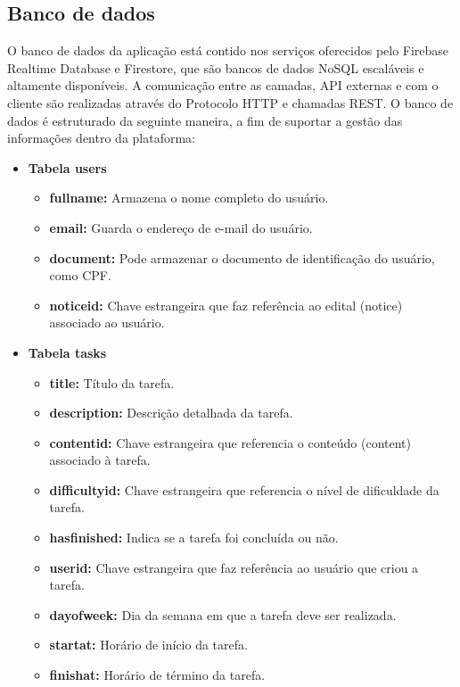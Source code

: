 \subsection{Banco de dados}
O banco de dados da aplicação está contido nos serviços oferecidos pelo Firebase Realtime Database e Firestore, que são bancos de dados NoSQL escaláveis e altamente disponíveis. A comunicação entre as camadas, API externas e com o cliente são realizadas através do Protocolo HTTP e chamadas REST.
O banco de dados é estruturado da seguinte maneira, a fim de suportar a gestão das informações dentro da plataforma:

\begin{itemize}
    \item \textbf{Tabela users}
    
    \begin{itemize}
    \item \textbf{fullname:} Armazena o nome completo do usuário.
    \item \textbf{email:} Guarda o endereço de e-mail do usuário.
    \item \textbf{document:} Pode armazenar o documento de identificação do usuário, como CPF. 
    \item \textbf{noticeid:} Chave estrangeira que faz referência ao edital (notice) associado ao usuário.
    \end{itemize}
    
    \item \textbf{Tabela tasks}
    
    \begin{itemize}
    \item \textbf{title:} Título da tarefa.
    \item \textbf{description:} Descrição detalhada da tarefa.
    \item \textbf{contentid:} Chave estrangeira que referencia o conteúdo (content) associado à tarefa. 
    \item \textbf{difficultyid:} Chave estrangeira que referencia o nível de dificuldade da tarefa. 
    \item \textbf{hasfinished:} Indica se a tarefa foi concluída ou não.
    \item \textbf{userid:} Chave estrangeira que faz referência ao usuário que criou a tarefa. 
    \item \textbf{dayofweek:} Dia da semana em que a tarefa deve ser realizada.
    \item \textbf{startat:} Horário de início da tarefa.
    \item \textbf{finishat:} Horário de término da tarefa.
    \end{itemize}
    

\end{itemize}
